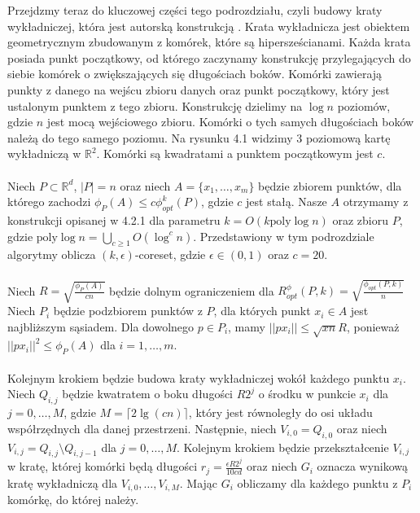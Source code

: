 Przejdzmy teraz do kluczowej części tego podrozdziału, czyli budowy kraty wykładniczej, która jest autorską konstrukcją \cite{10.1145/1007352.1007400}.
Krata wykładnicza jest obiektem geometrycznym zbudowanym z komórek, które są hipersześcianami.
Każda krata posiada punkt początkowy, od którego zaczynamy konstrukcję przylegających do siebie komórek o zwiększających się długościach boków.
Komórki zawierają punkty z danego na wejścu zbioru danych oraz punkt początkowy, który jest ustalonym punktem z tego zbioru.
Konstrukcję dzielimy na $\log n$ poziomów, gdzie $n$ jest mocą wejściowego zbioru.
Komórki o tych samych długościach boków należą do tego samego poziomu.
Na rysunku 4.1 widzimy 3 poziomową kartę wykładniczą w $\mathbb{R}^2$.
Komórki są kwadratami a punktem początkowym jest $c$.
\\~\\
Niech $P \subset \mathbb{R}^d$, $|P| = n$ oraz niech $A = \{x_{1}, \dots, x_{m}\}$ będzie zbiorem punktów, dla którego zachodzi $\phi_{P}(A) \leq c\phi_{opt}^{k}(P)$, gdzie $c$ jest stałą.
Nasze $A$ otrzymamy z konstrukcji opisanej w 4.2.1 dla parametru $k = O(k \text{poly} \log n)$ oraz zbioru $P$, gdzie $\text{poly} \log n = \bigcup_{c \geq 1} O(\log^{c}n)$.
Przedstawiony w tym podrozdziale algorytmy oblicza $(k, \epsilon)$-coreset, gdzie $\epsilon \in (0,1)$ oraz $c = 20$.
\\~\\
Niech $R = \sqrt{\frac{\phi_{P}(A)}{cn}}$ będzie dolnym ograniczeniem dla $R_{opt}^{\phi}(P, k) = \sqrt{\frac{\phi_{opt}(P, k)}{n}}$
Niech $P_{i}$ będzie podzbiorem punktów z $P$, dla których punkt $x_{i} \in A$ jest najbliższym sąsiadem. 
Dla dowolnego $p \in P_{i}$, mamy $||px_{i}|| \leq \sqrt{xn}R$, ponieważ $||px_{i}||^{2} \leq \phi_{P}(A)$ dla $i = 1, \dots, m$.
\\~\\
Kolejnym krokiem będzie budowa kraty wykładniczej wokół każdego punktu $x_{i}$.
Niech $Q_{i,j}$ będzie kwatratem o boku długości $R2^{j}$ o środku w punkcie $x_{i}$ dla $j = 0, \dots, M$, gdzie $M = \lceil 2 \lg(cn) \rceil$, który jest równoległy do osi układu współrzędnych dla danej przestrzeni.
Następnie, niech $V_{i, 0} = Q_{i, 0}$ oraz niech $V_{i,j} = Q_{i,j} \setminus Q_{i,j-1}$ dla $j = 0, \dots, M$.
Kolejnym krokiem będzie przekształcenie $V_{i,j}$ w kratę, której komórki będą długości $r_{j} = \frac{\epsilon R2^{j}}{10cd}$ oraz niech $G_{i}$ oznacza wynikową kratę wykładniczą dla $V_{i,0}, \dots, V_{i,M}$.
Mając $G_{i}$ obliczamy dla każdego punktu z $P_{i}$ komórkę, do której należy.
